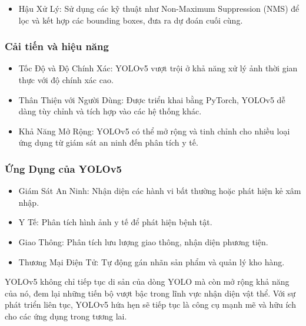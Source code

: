 \begin{flushleft}
\begin{itemize}
        \item Hậu Xử Lý: Sử dụng các kỹ thuật như Non-Maximum Suppression (NMS) để lọc và kết hợp các bounding boxes, đưa ra dự đoán cuối cùng.
    \end{itemize}
    \fontsize{13}{20}\selectfont\subsubsection{Cải tiến và hiệu năng}
    \begin{itemize}
        \item Tốc Độ và Độ Chính Xác: YOLOv5 vượt trội ở khả năng xử lý ảnh thời gian thực với độ chính xác cao.
        \item Thân Thiện với Người Dùng: Được triển khai bằng PyTorch, YOLOv5 dễ dàng tùy chỉnh và tích hợp vào các hệ thống khác.
        \item Khả Năng Mở Rộng: YOLOv5 có thể mở rộng và tinh chỉnh cho nhiều loại ứng dụng từ giám sát an ninh đến phân tích y tế.
    \end{itemize}
    \subsubsection{Ứng Dụng của YOLOv5}
    \begin{itemize}
        \item Giám Sát An Ninh: Nhận diện các hành vi bất thường hoặc phát hiện kẻ xâm nhập.
        \item Y Tế: Phân tích hình ảnh y tế để phát hiện bệnh tật.
        \item Giao Thông: Phân tích lưu lượng giao thông, nhận diện phương tiện.
        \item Thương Mại Điện Tử: Tự động gán nhãn sản phẩm và quản lý kho hàng.
    \end{itemize}
    YOLOv5 không chỉ tiếp tục di sản của dòng YOLO mà còn mở rộng khả năng của nó, đem lại những tiến bộ vượt bậc trong lĩnh vực nhận diện vật thể. Với sự phát triển liên tục, YOLOv5 hứa hẹn sẽ tiếp tục là công cụ mạnh mẽ và hữu ích cho các ứng dụng trong tương lai.

\end{flushleft}
